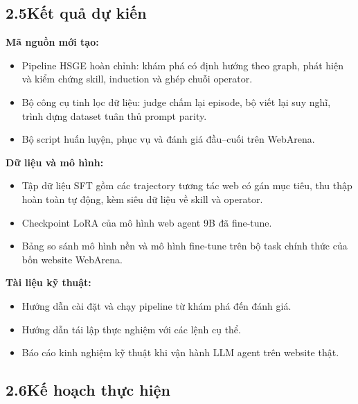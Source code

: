 \subsection*{2.5\quad Kết quả dự kiến}

\textbf{Mã nguồn mới tạo:}
\begin{itemize}
  \item Pipeline HSGE hoàn chỉnh: khám phá có định hướng theo graph, phát hiện
  và kiểm chứng skill, induction và ghép chuỗi operator.
  \item Bộ công cụ tinh lọc dữ liệu: judge chấm lại episode, bộ viết lại suy
  nghĩ, trình dựng dataset tuân thủ prompt parity.
  \item Bộ script huấn luyện, phục vụ và đánh giá đầu--cuối trên WebArena.
\end{itemize}

\textbf{Dữ liệu và mô hình:}
\begin{itemize}
  \item Tập dữ liệu SFT gồm các trajectory tương tác web có gán mục tiêu, thu
  thập hoàn toàn tự động, kèm siêu dữ liệu về skill và operator.
  \item Checkpoint LoRA của mô hình web agent 9B đã fine-tune.
  \item Bảng so sánh mô hình nền và mô hình fine-tune trên bộ task chính thức
  của bốn website WebArena.
\end{itemize}

\textbf{Tài liệu kỹ thuật:}
\begin{itemize}
  \item Hướng dẫn cài đặt và chạy pipeline từ khám phá đến đánh giá.
  \item Hướng dẫn tái lập thực nghiệm với các lệnh cụ thể.
  \item Báo cáo kinh nghiệm kỹ thuật khi vận hành LLM agent trên website thật.
\end{itemize}

\subsection*{2.6\quad Kế hoạch thực hiện}

